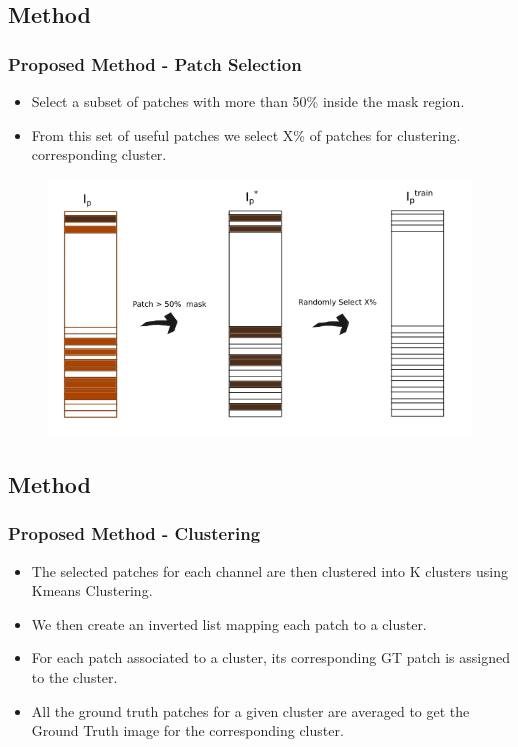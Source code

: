 \documentclass{beamer}
\begin{document}
\subsection{Method}
\begin{frame}
\frametitle{Proposed Method - Patch Selection}
\begin{itemize}
\item Select a subset of patches with more than 50\% inside the mask region. 
\item From this set of useful patches we select X\% of patches for clustering.
 corresponding cluster.
\end{itemize}
\begin{figure}
\includegraphics[width=0.8\linewidth]{Images/method3.png}

\end{figure}


\end{frame}


\subsection{Method}
\begin{frame}
\frametitle{Proposed Method - Clustering}
\begin{itemize}
\item The selected patches for each channel are then clustered into K clusters using Kmeans Clustering.
\item We then create an inverted list mapping each patch to a cluster.
\item For each patch associated to a cluster, its corresponding GT patch is assigned to the cluster.
\item All the ground truth patches for a given cluster are averaged to get the Ground Truth image for the corresponding cluster.
\end{itemize}

\end{frame}
\end{document}
